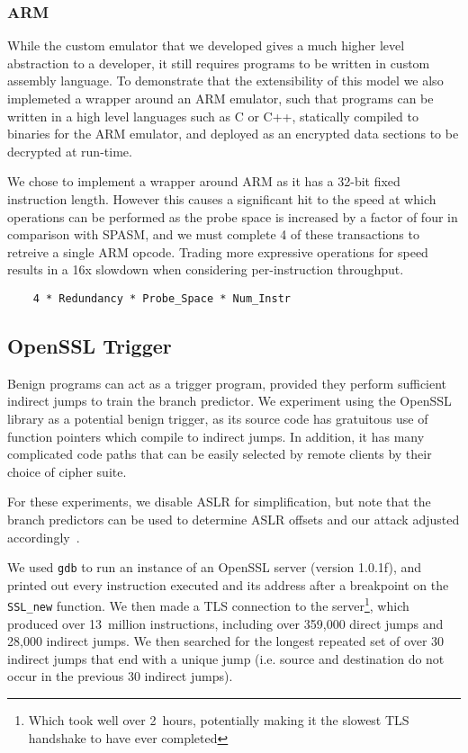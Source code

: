 \FigSpasmModel

\subsubsection{ARM}
\label{subsubsec:arm}
While the custom emulator that we developed gives a much higher level abstraction to 
a developer, it still requires programs to be written in custom assembly 
language. To demonstrate that the extensibility of this model we also implemeted a wrapper
around an ARM emulator, such that programs can be written in a high level languages 
such as C or C++, statically compiled to binaries for the ARM emulator, and deployed 
as an encrypted data sections to be decrypted at run-time.  



We chose to implement a wrapper around ARM as it has a 32-bit fixed instruction
length. However this causes a significant hit to the speed at which operations 
can be performed as the probe space is increased by a factor of four in 
comparison with SPASM,  and we must complete 4 of these transactions to 
retreive a single ARM opcode. Trading more expressive operations for speed
results in a 16x slowdown when considering per-instruction throughput. 

\begin{lstlisting}
    4 * Redundancy * Probe_Space * Num_Instr
\end{lstlisting}

\subsection{OpenSSL Trigger}
\label{subsec:openssl}

Benign programs can act as a trigger program, provided they perform sufficient
indirect jumps to train the branch predictor. We experiment using the OpenSSL
library as a potential benign trigger, as its source code has gratuitous use of
function pointers which compile to indirect jumps. In addition, it has many
complicated code paths that can be easily selected by remote clients by their
choice of cipher suite.

For these experiments, we disable ASLR for simplification, but note that the
branch predictors can be used to determine ASLR offsets and our attack adjusted
accordingly~\cite{evtyushkin2016jump}.

We used \texttt{gdb} to run an instance of an OpenSSL server (version 1.0.1f),
and printed out every instruction executed and its address after a breakpoint on
the \texttt{SSL\_new} function. We then made a TLS connection to the
server\footnote{Which took well over 2~hours, potentially making it the slowest
TLS handshake to have ever completed},
which produced over 13~million instructions, including over 359,000 direct jumps
and 28,000 indirect jumps. We then searched for the longest repeated set of over
30 indirect jumps that end with a unique jump (i.e. source and destination do
not occur in the previous 30 indirect jumps).

